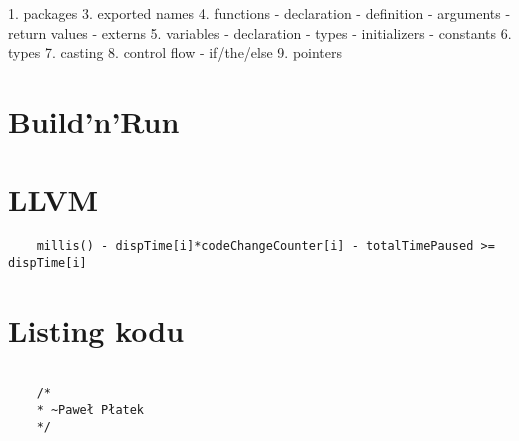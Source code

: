 \documentclass[a4paper,16pt]{article}
\begin{document}
    1. packages
    3. exported names
    4. functions
        - declaration
        - definition
        - arguments
        - return values
        - externs
    5. variables
        - declaration
        - types
        - initializers
        - constants
    6. types
    7. casting
    8. control flow
        - if/the/else
    9. pointers




    \section{Build'n'Run}

    \section{LLVM}


	
	
	\begin{lstlisting}
	millis() - dispTime[i]*codeChangeCounter[i] - totalTimePaused >= dispTime[i]
	\end{lstlisting}

	
	\section{Listing kodu}
	\begin{verbatim}
	
	/*
	* ~Paweł Płatek
	*/
	\end{verbatim}
	
\end{document}
